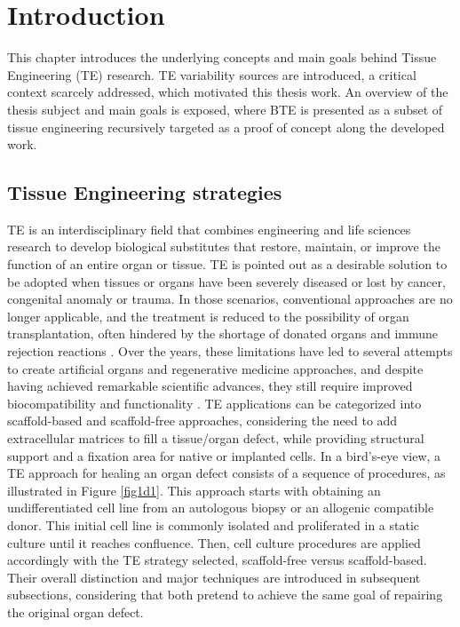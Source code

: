 
%


\newpage
\chapter{Introduction}
This chapter introduces the underlying concepts and main goals behind Tissue Engineering (TE) research. \ac{TE} variability sources are introduced, a critical context scarcely addressed, which motivated this thesis work. An overview of the thesis subject and main goals is exposed, where \ac{BTE} is presented as a subset of tissue engineering recursively targeted as a proof of concept along the developed work.


\newpage
\section{Tissue Engineering strategies}

\ac{TE} is an interdisciplinary field that combines engineering and life sciences research to develop biological substitutes that restore, maintain, or improve the function of an entire organ or tissue. \ac{TE} is pointed out as a desirable solution to be adopted when tissues or organs have been severely diseased or lost by cancer, congenital anomaly or trauma. In those scenarios, conventional approaches are no longer applicable, and the treatment is reduced to the possibility of organ transplantation, often hindered by the shortage of donated organs and immune rejection reactions \cite{Chandra2020-ay}. Over the years, these limitations have led to several attempts to create artificial organs and regenerative medicine approaches, and despite having achieved remarkable scientific advances, they still require improved biocompatibility and functionality \cite{Ikada2006-cd}. \ac{TE} applications can be categorized into scaffold-based and scaffold-free approaches, considering the need to add extracellular matrices to fill a tissue/organ defect, while providing structural support and a fixation area for native or implanted cells. In a bird’s-eye view, a \ac{TE} approach for healing an organ defect consists of a sequence of procedures, as illustrated in Figure \ref{fig1d1}. This approach starts with obtaining an undifferentiated cell line from an autologous biopsy or an allogenic compatible donor. This initial cell line is commonly isolated and proliferated in a static culture until it reaches confluence. Then, cell culture procedures are applied accordingly with the \ac{TE} strategy selected, scaffold-free versus scaffold-based. Their overall distinction and major techniques are introduced in subsequent subsections, considering that both pretend to achieve the same goal of repairing the original organ defect.  


